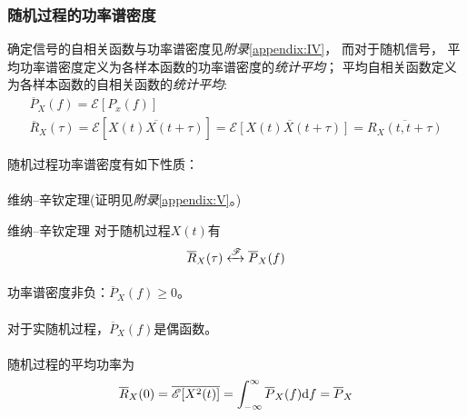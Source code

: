     \subsubsection{随机过程的功率谱密度}
    确定信号的自相关函数与功率谱密度见\emph{附录}\ref{appendix:IV}，
    而对于随机信号，
    平均功率谱密度定义为各样本函数的功率谱密度的\emph{统计平均}；
    平均自相关函数定义为各样本函数的自相关函数的\emph{统计平均}:
    \begin{align}
        \overline{P}_X(f)=\mathscr{E}[P_x(f)]\hspace{10em}\\
        \overline{R}_X(\tau)=\mathscr{E}[\overline{X(t)X(t+\tau)}]=\overline{\mathscr{E}[X(t)X(t+\tau)]}=\overline{R_X(t,t+\tau)}
    \end{align}

    随机过程功率谱密度有如下性质：
    \vspace{-1ex}
    
    \paragraph{}{维纳--辛钦定理(证明见\emph{附录}\ref{appendix:V}。)}
    \begin{mythm}{维纳--辛钦定理}
        对于随机过程$X(t)$有
        \begin{equation}
            \overline{R}_X(\tau)\xleftrightarrow[]{\mathscr{F}}\overline{P}_X(f)
        \end{equation}
    \end{mythm}

    \paragraph{}功率谱密度非负：$\overline{P}_X(f)\geq 0$。

    \paragraph{}对于实随机过程，$\overline{P}_X(f)$是偶函数。

    \paragraph{}随机过程的平均功率为
    \begin{equation}
        \overline{R}_X(0)=\overline{\mathscr{E}[X^2(t)]}=\int_{-\infty}^{\infty}\overline{P}_X(f)\text{\upshape d} f=\overline{P}_X
    \end{equation}

